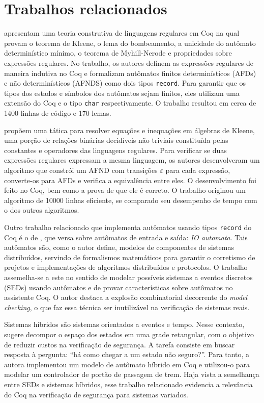 \chapter{Trabalhos relacionados}
\label{cap:relacionados}

 apresentam uma teoria construtiva de linguagens regulares em Coq na qual provam o teorema de Kleene, o lema do bombeamento, a unicidade do autômato determinístico mínimo, o teorema de Myhill-Nerode e propriedades sobre expressões regulares. No trabalho, os autores definem as expressões regulares de maneira indutiva no Coq e formalizam autômatos finitos determinísticos (\acs{AFD}s) e não determinísticos (\acs{AFND}S) como dois tipos \texttt{record}. Para garantir que os tipos dos estados e símbolos dos autômatos sejam finitos, eles utilizam uma extensão do Coq e o tipo \texttt{char} respectivamente. O trabalho resultou em cerca de 1400 linhas de código e 170 lemas.

 propõem uma tática para resolver equações e inequações em álgebras de Kleene, uma porção de relações binárias decidíveis não triviais constituída pelas constantes e operadores das linguagens regulares. Para verificar se duas expressões regulares expressam a mesma linguagem, os autores desenvolveram um algoritmo que constrói um AFND com transições $\varepsilon$ para cada expressão, converte-os para AFDs e verifica a equivalência entre eles. O desenvolvimento foi feito no Coq, bem como a prova de que ele é correto. O trabalho originou um algoritmo de 10000 linhas eficiente, se comparado seu desempenho de tempo com o dos outros algoritmos.

Outro trabalho relacionado que implementa autômatos usando tipos \texttt{record} do Coq é o de , que versa sobre autômatos de entrada e saída: \textit{IO automata}. Tais autômatos são, como o autor define, modelos de componentes de sistemas distribuídos, servindo de formalismos matemáticos para garantir o corretismo de projetos e implementações de algoritmos distribuídos e protocolos. O trabalho assemelha-se a este no sentido de modelar possíveis sistemas a eventos discretos (\acs{SED}s) usando autômatos e de provar características sobre autômatos no assistente Coq. O autor destaca a explosão combinatorial decorrente do \textit{model checking}, o que faz essa técnica ser inutilizável na verificação de sistemas reais.

Sistemas híbridos são sistemas orientados a eventos e tempo. Nesse contexto,  sugere decompor o espaço dos estados em uma grade retangular, com o objetivo de reduzir custos na verificação de segurança. A tarefa consiste em buscar resposta à pergunta: ``há como chegar a um estado não seguro?''. Para tanto, a autora implementou um modelo de autômato híbrido em Coq e utilizou-o para modelar um controlador de portão de passagem de trem. Haja vista a semelhança entre SEDs e sistemas híbridos, esse trabalho relacionado evidencia a relevância do Coq na verificação de segurança para sistemas variados.

